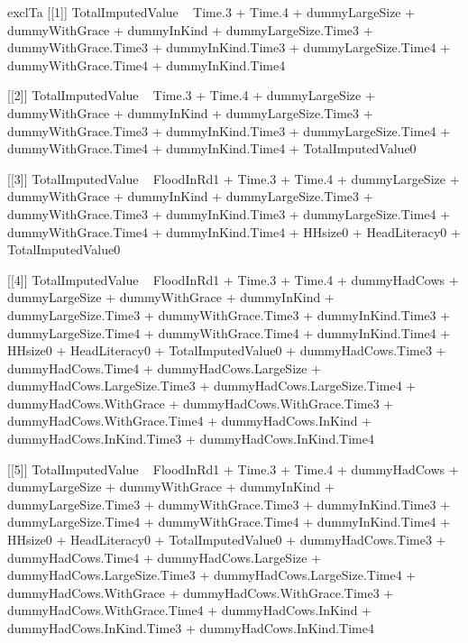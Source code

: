 \begin{Schunk}
\begin{Soutput}
[1] exclTa
[[1]]
TotalImputedValue ~ Time.3 + Time.4 + dummyLargeSize + dummyWithGrace + 
    dummyInKind + dummyLargeSize.Time3 + dummyWithGrace.Time3 + 
    dummyInKind.Time3 + dummyLargeSize.Time4 + dummyWithGrace.Time4 + 
    dummyInKind.Time4

[[2]]
TotalImputedValue ~ Time.3 + Time.4 + dummyLargeSize + dummyWithGrace + 
    dummyInKind + dummyLargeSize.Time3 + dummyWithGrace.Time3 + 
    dummyInKind.Time3 + dummyLargeSize.Time4 + dummyWithGrace.Time4 + 
    dummyInKind.Time4 + TotalImputedValue0

[[3]]
TotalImputedValue ~ FloodInRd1 + Time.3 + Time.4 + dummyLargeSize + 
    dummyWithGrace + dummyInKind + dummyLargeSize.Time3 + dummyWithGrace.Time3 + 
    dummyInKind.Time3 + dummyLargeSize.Time4 + dummyWithGrace.Time4 + 
    dummyInKind.Time4 + HHsize0 + HeadLiteracy0 + TotalImputedValue0

[[4]]
TotalImputedValue ~ FloodInRd1 + Time.3 + Time.4 + dummyHadCows + 
    dummyLargeSize + dummyWithGrace + dummyInKind + dummyLargeSize.Time3 + 
    dummyWithGrace.Time3 + dummyInKind.Time3 + dummyLargeSize.Time4 + 
    dummyWithGrace.Time4 + dummyInKind.Time4 + HHsize0 + HeadLiteracy0 + 
    TotalImputedValue0 + dummyHadCows.Time3 + dummyHadCows.Time4 + 
    dummyHadCows.LargeSize + dummyHadCows.LargeSize.Time3 + dummyHadCows.LargeSize.Time4 + 
    dummyHadCows.WithGrace + dummyHadCows.WithGrace.Time3 + dummyHadCows.WithGrace.Time4 + 
    dummyHadCows.InKind + dummyHadCows.InKind.Time3 + dummyHadCows.InKind.Time4

[[5]]
TotalImputedValue ~ FloodInRd1 + Time.3 + Time.4 + dummyHadCows + 
    dummyLargeSize + dummyWithGrace + dummyInKind + dummyLargeSize.Time3 + 
    dummyWithGrace.Time3 + dummyInKind.Time3 + dummyLargeSize.Time4 + 
    dummyWithGrace.Time4 + dummyInKind.Time4 + HHsize0 + HeadLiteracy0 + 
    TotalImputedValue0 + dummyHadCows.Time3 + dummyHadCows.Time4 + 
    dummyHadCows.LargeSize + dummyHadCows.LargeSize.Time3 + dummyHadCows.LargeSize.Time4 + 
    dummyHadCows.WithGrace + dummyHadCows.WithGrace.Time3 + dummyHadCows.WithGrace.Time4 + 
    dummyHadCows.InKind + dummyHadCows.InKind.Time3 + dummyHadCows.InKind.Time4
\end{Soutput}
\end{Schunk}

